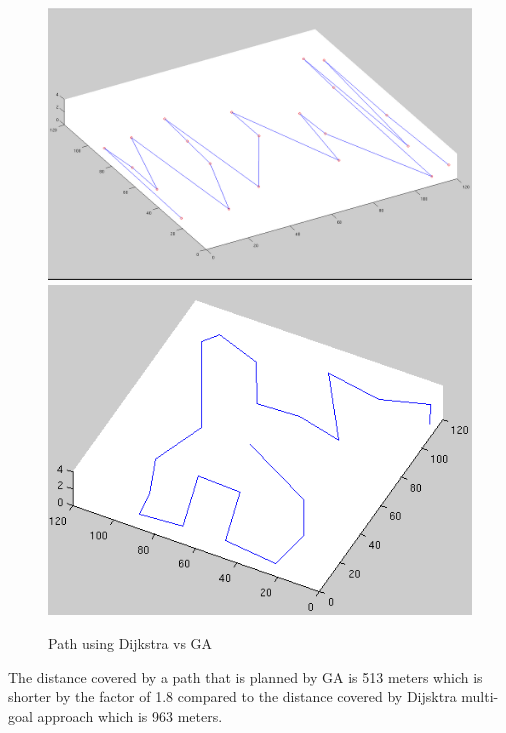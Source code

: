 \begin{figure}[!h]
  \includegraphics[width=\linewidth]{figures/DijkstraPath2.png}  
  \endminipage\hfill
   \includegraphics[width=\linewidth]{figures/Path_planned_G.png}
  \caption{Path using Dijkstra vs GA}
  \label{fig:Path_planning}
  
  \endminipage 
\end{figure}


The distance covered by a path that is planned by GA is 513 meters which is shorter by the factor of 1.8 compared to the distance covered by Dijsktra multi-goal approach which is 963 meters.


